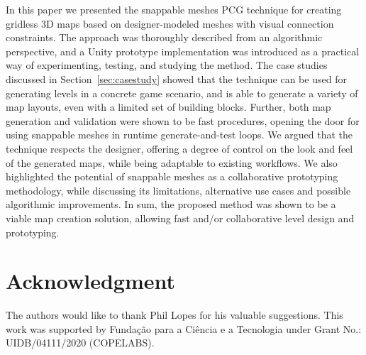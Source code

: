 \documentclass[journal]{IEEEtran}
\begin{document}
In this paper we presented the snappable meshes PCG technique for creating
gridless 3D maps based on designer-modeled meshes with visual connection
constraints. The approach was thoroughly described from an algorithmic perspective,
and a Unity prototype implementation was introduced as a practical way of
experimenting, testing, and studying the method. The case studies discussed in
Section~\ref{sec:casestudy} showed that the technique can be used for generating
levels in a concrete game scenario, and is able to generate a variety of map layouts,
even with a limited set of building blocks. Further, both map generation and validation
were shown to be fast procedures, opening the door for using snappable meshes in
runtime generate-and-test loops. We argued that the technique respects the designer,
offering a degree of control on the look and feel of the generated maps, while being
adaptable to existing workflows. We also highlighted the potential of snappable
meshes as a collaborative prototyping methodology, while discussing its limitations,
alternative use cases and possible algorithmic improvements. In sum, the proposed
method was shown to be a viable map creation solution, allowing  fast and/or
collaborative level design and prototyping.

\section*{Acknowledgment}

The authors would like to thank Phil Lopes for his valuable suggestions.
This work was supported by Fundação para a Ciência e a Tecnologia under
Grant No.: UIDB/04111/2020 (COPELABS).

\ifCLASSOPTIONcaptionsoff
  \newpage
\fi
\end{document}
